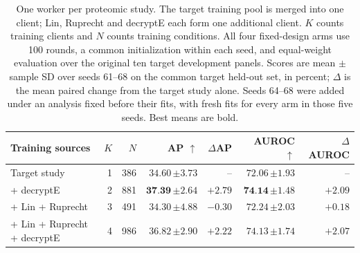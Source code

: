 \begin{table}[t]
\centering
\small
\setlength{\tabcolsep}{5pt}
\caption{One worker per proteomic study. The target training pool is merged into one client; Lin, Ruprecht and decryptE each form one additional client. $K$ counts training clients and $N$ counts training conditions. All four fixed-design arms use 100 rounds, a common initialization within each seed, and equal-weight evaluation over the original ten target development panels. Scores are mean $\pm$ sample SD over seeds 61--68 on the common target held-out set, in percent; $\Delta$ is the mean paired change from the target study alone. Seeds 64--68 were added under an analysis fixed before their fits, with fresh fits for every arm in those five seeds. Best means are bold.}
\label{tab:proteomics-study-clients}
\begin{tabular}{lrrrrrr}
\toprule
Training sources & $K$ & $N$ & AP $\uparrow$ & $\Delta$AP & AUROC $\uparrow$ & $\Delta$AUROC \\
\midrule
Target study & 1 & 386 & $34.60\,{\scriptstyle\pm3.73}$ & -- & $72.06\,{\scriptstyle\pm1.93}$ & -- \\
+ decryptE & 2 & 881 & $\textbf{37.39}\,{\scriptstyle\pm2.64}$ & $+2.79$ & $\textbf{74.14}\,{\scriptstyle\pm1.48}$ & $+2.09$ \\
+ Lin + Ruprecht & 3 & 491 & $34.30\,{\scriptstyle\pm4.88}$ & $-0.30$ & $72.24\,{\scriptstyle\pm2.03}$ & $+0.18$ \\
+ Lin + Ruprecht + decryptE & 4 & 986 & $36.82\,{\scriptstyle\pm2.90}$ & $+2.22$ & $74.13\,{\scriptstyle\pm1.74}$ & $+2.07$ \\
\bottomrule
\end{tabular}
\end{table}
